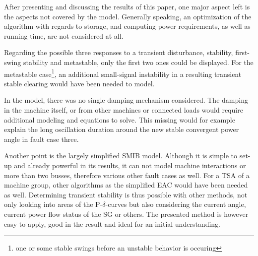 After presenting and discussing the results of this paper, one major aspect left is the aspects not covered by the model. Generally speaking, an optimization of the algorithm with regards to storage, and computing power requirements, as well as running time, are not considered at all. 

Regarding the possible three responses to a transient disturbance, stability, first-swing stability and metastable, only the first two ones could be displayed. For the metastable case\footnote{one or some stable swings before an unstable behavior is occuring}, an additional small-signal instability in a resulting transient stable clearing would have been needed to model. \autocite{kundurPowerSystemStability2022}

In the model, there was no single damping mechanism considered. The damping in the machine itself, or from other machines or connected loads would require additional modeling and equations to solve. This missing would for example explain the long oscillation duration around the new stable convergent power angle in fault case three.

Another point is the largely simplified \acs{SMIB} model. Although it is simple to set-up and already powerful in its results, it can not model machine interactions or more than two busses, therefore various other fault cases as well. For a \acs{TSA} of a machine group, other algorithms as the simplified \acs{EAC} would have been needed as well. \autocite{batchuComparativeStudyEqual2022} Determining transient stability is thus possible with other methods, not only looking into areas of the P-$\delta$-curves but also considering the current angle, current power flow status of the \acs{SG} or others. The presented method is however easy to apply, good in the result and ideal for an initial understanding.